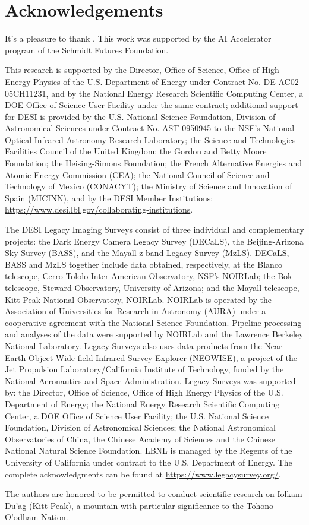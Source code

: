 \documentclass[12pt, letterpaper, preprint, comicneue]{aastex63}
\begin{document}






\section*{Acknowledgements}
It's a pleasure to thank . 
This work was supported by the AI Accelerator program of the Schmidt Futures
Foundation.

This research is supported by the Director, Office of Science, Office of High
Energy Physics of the U.S. Department of Energy under Contract No.
DE-AC02-05CH11231, and by the National Energy Research Scientific Computing
Center, a DOE Office of Science User Facility under the same contract;
additional support for DESI is provided by the U.S. National Science
Foundation, Division of Astronomical Sciences under Contract No. AST-0950945 to
the NSF's National Optical-Infrared Astronomy Research Laboratory; the Science
and Technologies Facilities Council of the United Kingdom; the Gordon and Betty
Moore Foundation; the Heising-Simons Foundation; the French Alternative
Energies and Atomic Energy Commission (CEA); the National Council of Science
and Technology of Mexico (CONACYT); the Ministry of Science and Innovation of
Spain (MICINN), and by the DESI Member Institutions:
\url{https://www.desi.lbl.gov/collaborating-institutions}.

The DESI Legacy Imaging Surveys consist of three individual and complementary
projects: the Dark Energy Camera Legacy Survey (DECaLS), the Beijing-Arizona
Sky Survey (BASS), and the Mayall z-band Legacy Survey (MzLS). DECaLS, BASS and
MzLS together include data obtained, respectively, at the Blanco telescope,
Cerro Tololo Inter-American Observatory, NSF’s NOIRLab; the Bok telescope,
Steward Observatory, University of Arizona; and the Mayall telescope, Kitt Peak
National Observatory, NOIRLab. NOIRLab is operated by the Association of
Universities for Research in Astronomy (AURA) under a cooperative agreement
with the National Science Foundation. Pipeline processing and analyses of the
data were supported by NOIRLab and the Lawrence Berkeley National Laboratory.
Legacy Surveys also uses data products from the Near-Earth Object Wide-field
Infrared Survey Explorer (NEOWISE), a project of the Jet Propulsion
Laboratory/California Institute of Technology, funded by the National
Aeronautics and Space Administration. Legacy Surveys was supported by: the
Director, Office of Science, Office of High Energy Physics of the U.S.
Department of Energy; the National Energy Research Scientific Computing Center,
a DOE Office of Science User Facility; the U.S. National Science Foundation,
Division of Astronomical Sciences; the National Astronomical Observatories of
China, the Chinese Academy of Sciences and the Chinese National Natural Science
Foundation. LBNL is managed by the Regents of the University of California
under contract to the U.S. Department of Energy. 
The complete acknowledgments can be found at
\url{https://www.legacysurvey.org/}.

The authors are honored to be permitted to conduct scientific research on
Iolkam Du’ag (Kitt Peak), a mountain with particular significance to the Tohono
O’odham Nation.

\appendix





 
\end{document}
